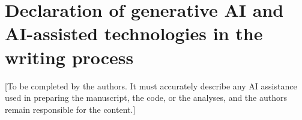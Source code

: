 \documentclass[preprint,12pt,authoryear]{elsarticle}
\begin{document}
\section*{Declaration of generative AI and AI-assisted technologies in the writing process}
[To be completed by the authors. It must accurately describe any AI assistance used in preparing the manuscript, the code, or the analyses, and the authors remain responsible for the content.]

\nocite{*}


\end{document}
